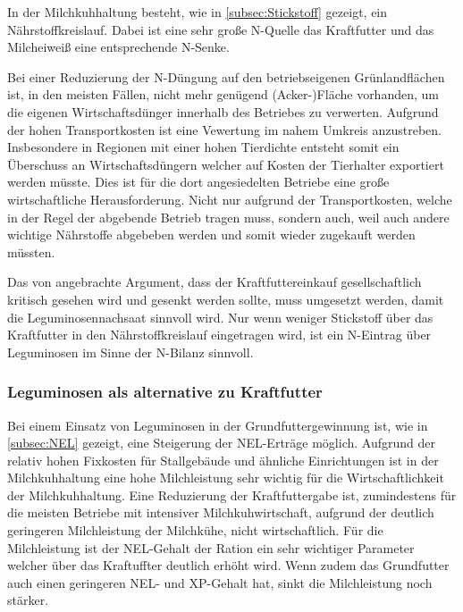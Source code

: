 In der Milchkuhhaltung besteht, wie in \cref{subsec:Stickstoff} gezeigt, ein Nährstoffkreislauf.
Dabei ist eine sehr große N-Quelle das Kraftfutter und das Milcheiweiß eine entsprechende N-Senke.

Bei einer Reduzierung der N-Düngung auf den betriebseigenen Grünlandflächen ist, in den meisten Fällen, nicht mehr genügend (Acker-)Fläche vorhanden, um die eigenen Wirtschaftsdünger innerhalb des Betriebes zu verwerten.
Aufgrund der hohen Transportkosten ist eine Vewertung im nahem Umkreis anzustreben.
Insbesondere in Regionen mit einer hohen Tierdichte entsteht somit ein Überschuss an Wirtschaftsdüngern welcher auf Kosten der Tierhalter exportiert werden müsste.
Dies ist für die dort angesiedelten Betriebe eine große wirtschaftliche Herausforderung.
Nicht nur aufgrund der Transportkosten, welche in der Regel der abgebende Betrieb tragen muss, sondern auch, weil auch andere wichtige Nährstoffe abgebeben werden und somit wieder zugekauft werden müssten.

Das von \textcite[33]{weggler2050leguminosen} angebrachte Argument, dass der Kraftfuttereinkauf gesellschaftlich kritisch gesehen wird und gesenkt werden sollte, muss umgesetzt werden, damit die Leguminosennachsaat sinnvoll wird.
Nur wenn weniger Stickstoff über das Kraftfutter in den Nährstoffkreislauf eingetragen wird, ist ein N-Eintrag über Leguminosen im Sinne der N-Bilanz sinnvoll.

\subsubsection{Leguminosen als alternative zu Kraftfutter}
\label{subsub:alternative}
Bei einem Einsatz von Leguminosen in der Grundfuttergewinnung ist, wie in \cref{subsec:NEL} gezeigt, eine Steigerung der \ac{NEL}-Erträge möglich.
Aufgrund der relativ hohen Fixkosten für Stallgebäude und ähnliche Einrichtungen ist in der Milchkuhhaltung eine hohe Milchleistung sehr wichtig für die Wirtschaftlichkeit der Milchkuhhaltung.
Eine Reduzierung der Kraftfuttergabe ist, zumindestens für die meisten Betriebe mit intensiver Milchkuhwirtschaft, aufgrund der deutlich geringeren Milchleistung der Milchkühe, nicht wirtschaftlich.
Für die Milchleistung ist der \ac{NEL}-Gehalt der Ration ein sehr wichtiger Parameter welcher über das Kraftuffter deutlich erhöht wird.
Wenn zudem das Grundfutter auch einen geringeren \ac{NEL}- und \ac{XP}-Gehalt hat, sinkt die Milchleistung noch stärker. 

